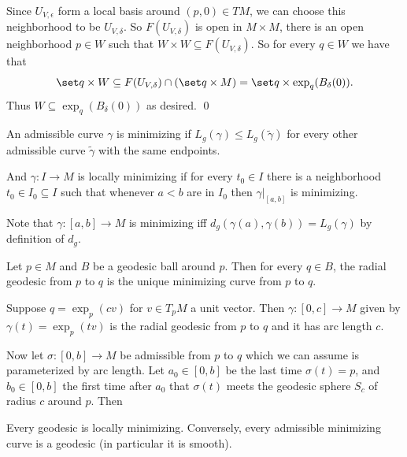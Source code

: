     Since $U_{V,\epsilon}$ form a local basis around $(p,0)\in TM$, we can choose this neighborhood to be $U_{V,\delta}$.
    So $F(U_{V,\delta})$ is open in $M\times M$, there is an open neighborhood $p\in W$ such that $W\times W\subseteq F(U_{V,\delta})$.
    So for every $q\in W$ we have that
    $$ \set q\times W\subseteq F(U_{V,\delta})\cap(\set q\times M) = \set q\times\exp_q(B_\delta(0)) . $$
    Thus $W\subseteq\exp_q(B_\delta(0))$ as desired.
    \qed

\eproof

\bdefn

    An admissible curve $\gamma$ is {\emphcolor minimizing} if $L_g(\gamma)\leq L_g(\tilde\gamma)$ for every other admissible curve $\tilde\gamma$
    with the same endpoints.

    And $\gamma\colon I\to M$ is {\emphcolor locally minimizing} if for every $t_0\in I$ there is a neighborhood $t_0\in I_0\subseteq I$
    such that whenever $a<b$ are in $I_0$ then $\gamma|_{[a,b]}$ is minimizing.

\edefn

Note that $\gamma\colon[a,b]\to M$ is minimizing iff $d_g(\gamma(a),\gamma(b))=L_g(\gamma)$ by definition of $d_g$.

\blemm

    Let $p\in M$ and $B$ be a geodesic ball around $p$.
    Then for every $q\in B$, the radial geodesic from $p$ to $q$ is the unique minimizing curve from $p$ to $q$.

\elemm

\bproof

    Suppose $q=\exp_p(cv)$ for $v\in T_pM$ a unit vector.
    Then $\gamma\colon[0,c]\to M$ given by $\gamma(t)=\exp_p(tv)$ is the radial geodesic from $p$ to $q$ and it has arc length $c$.

    Now let $\sigma\colon[0,b]\to M$ be admissible from $p$ to $q$ which we can assume is parameterized by arc length.
    Let $a_0\in[0,b]$ be the last time $\sigma(t)=p$, and $b_0\in[0,b]$ the first time after $a_0$ that $\sigma(t)$ meets the geodesic
    sphere $S_c$ of radius $c$ around $p$.
    Then 

\eproof

\bthrm

    Every geodesic is locally minimizing.
    Conversely, every admissible minimizing curve is a geodesic (in particular it is smooth).

\ethrm

\bproof

